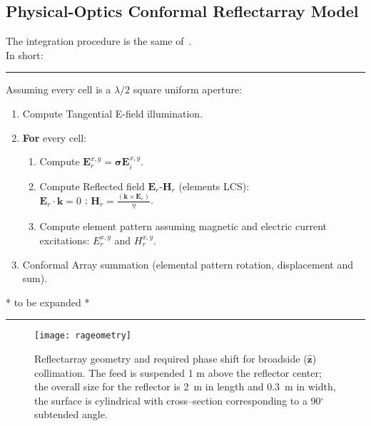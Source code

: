 \documentclass[11pt, a4paper]{scrartcl}
\newcommand{\degrees}{\ensuremath{^\circ}}
\begin{document}
    \subsection{Physical-Optics Conformal Reflectarray Model}
    \label{subsec:physical_optics_conformal_reflectarray_model}
    The integration procedure is the same of~\cite{PradoCrosspolar2017}.\\
    In short:\\
    \noindent\rule{\textwidth}{0.4pt}
    \begin{ttfamily}
        \small
        Assuming every cell is a $\lambda/2$ square uniform aperture:
        \begin{enumerate}
            \item Compute Tangential E-field illumination.
            \item \textbf{For} every cell:
            \begin{enumerate}
                \item Compute $\mathbf{E}_{r}^{x,y} = \mathbf{\sigma} \mathbf{E}_{i}^{x,y}$.
                \item Compute Reflected field $\mathbf{E}_{r}$-$\mathbf{H}_{r}$ (elements LCS):\\
                $\mathbf{E}_{r} \cdot \mathbf{k} = 0$ ; $\mathbf{H}_{r} = \frac{(\mathbf{k} \times \mathbf{E}_{r})}{\eta}$.
                \item Compute element pattern assuming magnetic and electric current \\excitations:
                ${E}_{r}^{x,y}$ and ${H}_{r}^{x,y}$.
            \end{enumerate}
            \item Conformal Array summation (elemental pattern rotation, displacement and sum).
        \end{enumerate}
    \end{ttfamily}
    * to be expanded *\\
    \noindent\rule{\textwidth}{0.4pt}


    \begin{figure}[!tb]
        \texttt{[image: rageometry]}
        \caption{Reflectarray geometry and required phase shift for broadside ($\mathbf{\hat{z}}$) collimation.
        The feed is suspended 1 m above the reflector center; the overall size for the reflector is 2~m in
        length and 0.3~m in width, the surface is cylindrical with cross--section corresponding to a 90\degrees
        subtended angle.}
        \label{fig:rageom}
    \end{figure}
\end{document}

